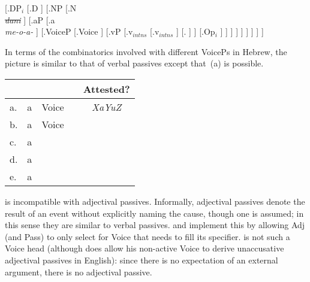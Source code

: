                     [.DP$_i$
	                    [.D ]
	                    [.NP
		                    [.N\\\sout{\emph{dani}} ]
	                        [.aP
	                            [.a\\\emph{me-o-a-} ]
	                            [.VoiceP
	                                [.Voice ]
	                                [.vP
	                                    [.v$_{intns}$
	                                        [.v$_{intns}$ ]
	                                        [.{} ]
	                                    ]
	                                    [.{Op$_i$} ]
	                                ]
	                            ]
	                        ]
	                    ]
                    ]
                ]
            ]
        ]
\xe

In terms of the combinatorics involved with different VoicePs in Hebrew, the picture is similar to that of verbal passives except that~(\nextx a) is possible.
\ex \begin{tabular}{llllc}
	& & & & Attested? \\\hline
	a.& a	&	Voice	& 		& \emph{XaYuZ} \\
	b.& a	& Voice		& \va	& {\mpua} \\
	c.& a	& {\vz}		& 		& \xmark\\
	d.& a	& {\vz}		&	\va	& \xmark\\
	e.& a	& {\vd}		&		& {\mhuf} \\
	\end{tabular}
\xe

\textbf{\vz} is incompatible with adjectival passives. Informally, adjectival passives denote the result of an event without explicitly naming the cause, though one is assumed; in this sense they are similar to verbal passives. \cite{alexiadouetal14} and \cite{bruening14nllt} implement this by allowing Adj (and Pass) to only select for Voice that needs to fill its specifier. {\vz} is not such a Voice head (although \citealt{embick04li} does allow his non-active Voice to derive unaccusative adjectival passives in English): since there is no expectation of an external argument, there is no adjectival passive.


